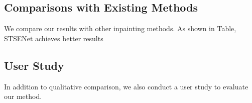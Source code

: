 \subsection{Comparisons with Existing Methods}
We compare our results with other inpainting methods.
As shown in Table, STSENet achieves better results
\begin{table}[t]
	\caption{Comparisons with existing methods.}\smallskip
	
	\centering
	\label{tab:lfec}
\end{table}

\subsection{User Study}
In addition to qualitative comparison, we also conduct a user study to evaluate our method.